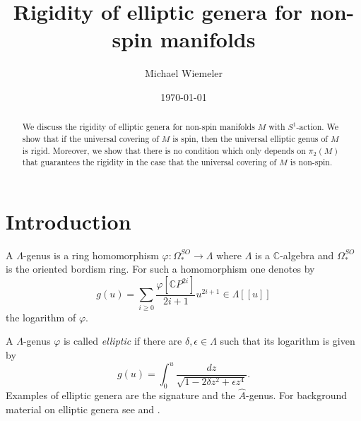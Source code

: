 \documentclass[a4paper, 11pt]{amsart}
\theoremstyle{definition}
\theoremstyle{remark}
\numberwithin{equation}{section}
\begin{document}
\title{Rigidity of elliptic genera for non-spin manifolds}


 \author{Michael Wiemeler}
 \address{WWU M\"unster\\ Mathematisches Institut\\ Einsteinstra\ss{}e 62\\48149 M\"unster\\Germany}




\date{\today}


\begin{abstract}
  We discuss the rigidity of elliptic genera for non-spin manifolds \(M\) with \(S^1\)-action.
  We show that if the universal covering of \(M\) is spin, then the universal elliptic genus of \(M\) is rigid.
  Moreover, we show that there is no condition which only depends on \(\pi_2(M)\) that guarantees the rigidity in the case that the universal covering of \(M\) is non-spin.
\end{abstract}

\maketitle

\section{Introduction}
\label{sec:introduction}

A \(\Lambda\)-genus is a ring homomorphism \(\varphi:\Omega_*^{SO}\rightarrow \Lambda\) where \(\Lambda\) is a \(\mathbb{C}\)-algebra and \(\Omega^{SO}_*\) is the oriented bordism ring.
For such a homomorphism one denotes by
\begin{equation*}
  g(u)=\sum_{i\geq 0} \frac{\varphi[\mathbb{C} P^{2i}]}{2i+1} u^{2i+1} \in \Lambda[[u]]
\end{equation*}
the logarithm of \(\varphi\).

A \(\Lambda\)-genus \(\varphi\) is called \emph{elliptic} if there are \(\delta,\epsilon\in\Lambda\) such that its logarithm is given by
\begin{equation*}
  g(u)=\int_0^u\frac{dz}{\sqrt{1-2\delta z^2+\epsilon z^4}}.
\end{equation*}
Examples of elliptic genera are the signature and the \(\hat{A}\)-genus.
For background material on elliptic genera see \cite{MR1189136} and \cite{MR970278}.
\end{document}
